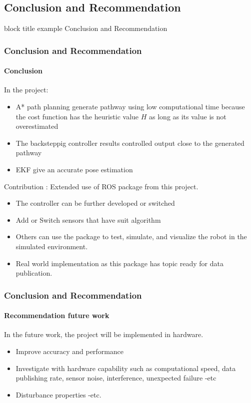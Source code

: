 \begin{frame}
	\section{Conclusion and Recommendation}
	\begin{beamercolorbox}[rounded=true]{block title example}
		\centering
		\LARGE
		Conclusion and Recommendation
	\end{beamercolorbox}
\end{frame}



\begin{frame}
	\frametitle{Conclusion and Recommendation}
	\framesubtitle{Conclusion}
	In the project:
	\begin{itemize}
		\item A* path planning generate pathway using low computational time because the cost function has the heuristic value $H$ as long as its value is not overestimated
		\item The backsteppig controller results controlled output close to the generated pathway
		\item EKF give an accurate pose estimation
	\end{itemize}
	\pause
	Contribution : Extended use of ROS package from this project.
	\begin{itemize}
		\item The controller can be further developed or switched
		\item Add or Switch sensors that have suit algorithm
		\item Others can use the package to test, simulate, and visualize the robot in the simulated environment.
		\item Real world implementation as this package has topic ready for data publication.
	\end{itemize}
\end{frame}


\begin{frame}
	\frametitle{Conclusion and Recommendation}
	\framesubtitle{Recommendation future work}
	In the future work, the project will be implemented in hardware.
	\begin{itemize}
		\item Improve accuracy and performance
		\item Investigate with hardware capability such as computational speed, data publishing rate, sensor noise, interference, unexpected failure -etc
		\item Disturbance properties -etc.
	\end{itemize}
\end{frame}